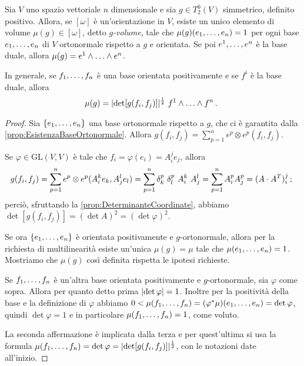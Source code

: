 \begin{proposition} %
	Sia $V$ uno spazio vettoriale $n$ dimensionale e sia $g\in T^0_2(V)$ simmetrico, definito positivo. Allora, se $[\omega]$ è un'orientazione in $V$, esiste un unico elemento di volume $\mu(g) \in [\omega]$, detto \emph{$g$-volume}, tale che $\mu(g)(\seqb en,) = 1$ per ogni base $\seqb en,$ di $V$ ortonormale rispetto a $g$ e orientata.
	Se poi $\seqa en,$ è la base duale, allora $\mu(g) = \seqa en\wedge$.
	
	In generale, se $\seqb fn,$ è una base orientata positivamente e se $f^i$ è la base duale, allora
	\begin{equation*}
		\mu(g) = \abs{ \det[g(f_i,f_j)] }^{\frac 12}\ \seqa fn\wedge \punto
	\end{equation*}
\end{proposition}
\begin{proof}
	Sia $\{\seqb en,\}$ una base ortonormale rispetto a $g$, che ci è garantita dalla \cref{prop:EsistenzaBaseOrtonormale}. Allora $g(f_i,f_j) = \sum_{p=1}^n e^p\otimes e^p (f_i,f_j)$.
	
	Se $\varphi \in \mathrm{GL}(V,V)$ è tale che $f_i = \varphi(e_i) = A_i^je_j$, allora
	\begin{equation*}
	g(f_i,f_j) = \sum_{p=1}^n e^p\otimes e^p (A_i^k e_k, A_j^le_l) = \sum_{p=1}^n \delta_k^p\ \delta_l^p\ A_i^k\ A_j^l = \sum_{p=1}^nA_i^pA_j^p = (A \cdot A^T)_i^j\puntovirgola
	\end{equation*}
	perciò, sfruttando la \cref{prop:DeterminanteCoordinate}, abbiamo $\det[g(f_i,f_j)] = (\det A)^2 = (\det\varphi)^2$.
	
	Se ora $\{\seqb en,\}$ è orientata positivamente e $g$-ortonormale, allora per la richiesta di multilinearità esiste un'unica $\mu(g)=\mu$ tale che $\mu(\seqb en,) = 1$. Mostriamo che $\mu(g)$ così definita rispetta le ipotesi richieste.
	
	Se $\seqb fn,$ è un'altra base orientata positivamente e $g$-ortonormale, sia $\varphi$ come sopra. Allora per quanto detto prima $\abs{\det\varphi} = 1$. Inoltre per la positività della base e la definizione di $\varphi$ abbiamo $0<\mu(\seqb fn,) = (\varphi^*\mu)(\seqb en,) = \det\varphi$, quindi $\det\varphi=1$ e in particolare $\mu(\seqb fn,)=1$, come voluto.
	
	La seconda affermazione è implicata dalla terza e per quest'ultima si usa la formula $\mu(\seqb fn,) = \det\varphi = \abs{ \det[g(f_i,f_j)] }^\frac 12$, con le notazioni date all'inizio.
\end{proof}

